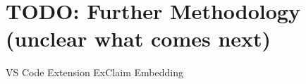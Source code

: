 \chapter{TODO: Further Methodology (unclear what comes next)} %


\begin{todolist}
    \todoitem VS Code Extension
    \todoitem ExClaim Embedding
\end{todolist}


